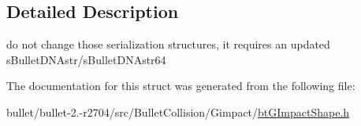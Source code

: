 \subsection{Detailed Description}
do not change those serialization structures, it requires an updated s\+Bullet\+D\+N\+Astr/s\+Bullet\+D\+N\+Astr64 

The documentation for this struct was generated from the following file\+:\begin{DoxyCompactItemize}
\item 
bullet/bullet-\/2.-\/r2704/src/\+Bullet\+Collision/\+Gimpact/\hyperlink{bt_g_impact_shape_8h}{bt\+G\+Impact\+Shape.\+h}\end{DoxyCompactItemize}
